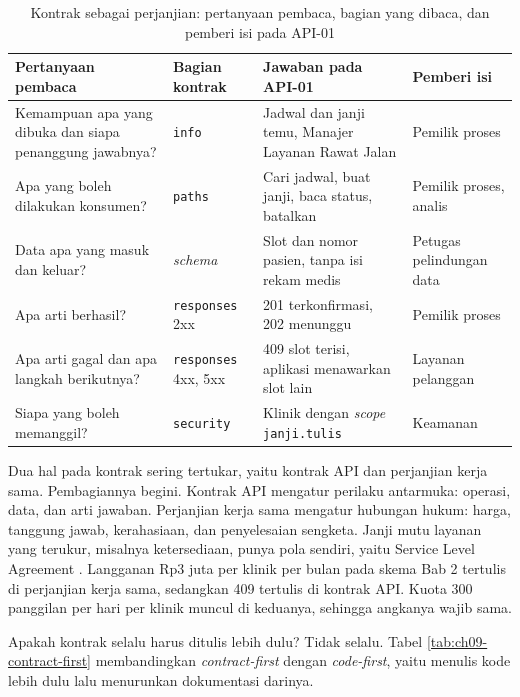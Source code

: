 \begin{table}[!htb]
  \centering
  \caption{Kontrak sebagai perjanjian: pertanyaan pembaca, bagian yang dibaca, dan pemberi isi pada API-01}
  \label{tab:ch09-baca-kontrak}
  \footnotesize
  \begin{tabularx}{\textwidth}{GH{2.1cm}GH{2.5cm}}
    \hline
    \textbf{Pertanyaan pembaca} & \textbf{Bagian kontrak} & \textbf{Jawaban pada API-01} & \textbf{Pemberi isi} \\ \hline
    Kemampuan apa yang dibuka dan siapa penanggung jawabnya? & \texttt{info} & Jadwal dan janji temu, Manajer Layanan Rawat Jalan & Pemilik proses \\ \hline
    Apa yang boleh dilakukan konsumen? & \texttt{paths} & Cari jadwal, buat janji, baca status, batalkan & Pemilik proses, analis \\ \hline
    Data apa yang masuk dan keluar? & \textit{schema} & Slot dan nomor pasien, tanpa isi rekam medis & Petugas pelindungan data \\ \hline
    Apa arti berhasil? & \texttt{responses} 2xx & 201 terkonfirmasi, 202 menunggu & Pemilik proses \\ \hline
    Apa arti gagal dan apa langkah berikutnya? & \texttt{responses} 4xx, 5xx & 409 slot terisi, aplikasi menawarkan slot lain & Layanan pelanggan \\ \hline
    Siapa yang boleh memanggil? & \texttt{security} & Klinik dengan \textit{scope} \texttt{janji.tulis} & Keamanan \\ \hline
  \end{tabularx}
\end{table}

Dua hal pada kontrak sering tertukar, yaitu kontrak API dan perjanjian kerja sama. Pembagiannya begini. Kontrak API mengatur perilaku
antarmuka: operasi, data, dan arti jawaban. Perjanjian kerja sama mengatur hubungan hukum: harga, tanggung jawab, kerahasiaan, dan
penyelesaian sengketa. Janji mutu layanan yang terukur, misalnya ketersediaan, punya pola sendiri, yaitu Service Level Agreement
\cite{zimmermann2022patterns}. Langganan Rp3 juta per klinik per bulan pada skema Bab 2 tertulis di perjanjian kerja sama, sedangkan
409 tertulis di kontrak API. Kuota 300 panggilan per hari per klinik muncul di keduanya, sehingga angkanya wajib sama.

Apakah kontrak selalu harus ditulis lebih dulu? Tidak selalu. Tabel \ref{tab:ch09-contract-first} membandingkan \textit{contract-first}
dengan \textit{code-first}, yaitu menulis kode lebih dulu lalu menurunkan dokumentasi darinya.

